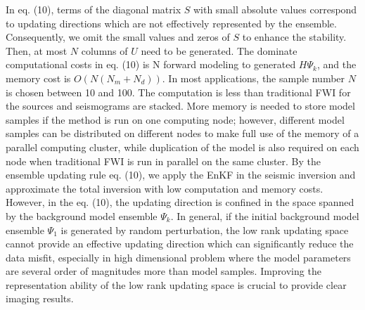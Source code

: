 \documentclass[mreferee]{gji}
\begin{document}
In eq. (10), terms of the diagonal matrix $S$ with small absolute values correspond to updating directions which are not effectively represented by the ensemble. Consequently, we omit the small values and zeros of $S$ to enhance the stability. Then, at most $N$ columns of $U$ need to be generated. The dominate computational costs in eq. (10) is N forward modeling to generated $H\Psi_k$, and the memory cost is $O(N(N_m+N_d))$. In most applications, the sample number $N$ is chosen between 10 and 100. The computation is less than traditional FWI for the sources and seismograms are stacked. More memory is needed to store model samples if the method is run on one computing node; however, different model samples can be distributed on different nodes to make full use of the memory of a parallel computing cluster, while duplication of the model is also required on each node when traditional FWI is run in parallel on the same cluster.
By the ensemble updating rule eq. (10), we apply the EnKF in the seismic inversion and approximate the total inversion with low computation and memory costs. However, in the eq. (10), the updating direction is confined in the space spanned by the background model ensemble $\Psi_k$. In general, if the initial background model ensemble $\Psi_1$ is generated by random perturbation, the low rank updating space cannot provide an effective updating direction which can significantly reduce the data misfit, especially in high dimensional problem where the model parameters are several order of magnitudes more than model samples. Improving the representation ability of the low rank updating space is crucial to provide clear imaging results.
\end{document}
